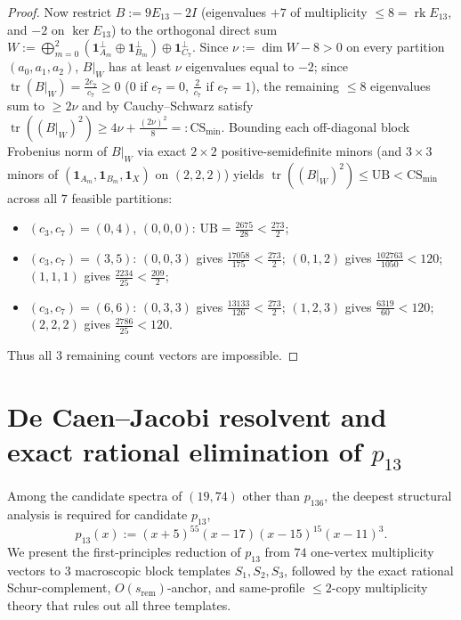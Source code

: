 \documentclass[11pt,reqno]{amsart}
\theoremstyle{definition}
\theoremstyle{remark}
\numberwithin{equation}{section}
\numberwithin{table}{section}
\DeclareMathOperator{\tr}{tr}
\DeclareMathOperator{\rk}{rk}
\begin{document}
\begin{proof}
Now restrict $B := 9 E_{13} - 2I$ (eigenvalues $+7$ of multiplicity $\le 8 = \rk E_{13}$, and $-2$ on $\ker E_{13}$) to the orthogonal direct sum $W := \bigoplus_{m=0}^2 (\mathbf{1}_{A_m}^\perp \oplus \mathbf{1}_{B_m}^\perp) \oplus \mathbf{1}_{C_7}^\perp$. Since $\nu := \dim W - 8 > 0$ on every partition $(a_0, a_1, a_2)$, $B|_W$ has at least $\nu$ eigenvalues equal to $-2$; since $\tr(B|_W) = \frac{2e_7}{c_7} \ge 0$ ($0$ if $e_7 = 0$, $\frac{2}{c_7}$ if $e_7 = 1$), the remaining $\le 8$ eigenvalues sum to $\ge 2\nu$ and by Cauchy--Schwarz satisfy $\tr((B|_W)^2) \ge 4\nu + \frac{(2\nu)^2}{8} =: \mathrm{CS}_{\min}$. Bounding each off-diagonal block Frobenius norm of $B|_W$ via exact $2 \times 2$ positive-semidefinite minors (and $3 \times 3$ minors of $(\mathbf{1}_{A_m}, \mathbf{1}_{B_m}, \mathbf{1}_X)$ on $(2, 2, 2)$) yields $\tr((B|_W)^2) \le \mathrm{UB} < \mathrm{CS}_{\min}$ across all $7$ feasible partitions:
\begin{itemize}
  \item $(c_3, c_7) = (0, 4)$, $(0, 0, 0)$: $\mathrm{UB} = \frac{2675}{28} < \frac{273}{2}$;
  \item $(c_3, c_7) = (3, 5)$: $(0, 0, 3)$ gives $\frac{17058}{175} < \frac{273}{2}$; $(0, 1, 2)$ gives $\frac{102763}{1050} < 120$; $(1, 1, 1)$ gives $\frac{2234}{25} < \frac{209}{2}$;
  \item $(c_3, c_7) = (6, 6)$: $(0, 3, 3)$ gives $\frac{13133}{126} < \frac{273}{2}$; $(1, 2, 3)$ gives $\frac{6319}{60} < 120$; $(2, 2, 2)$ gives $\frac{2786}{25} < 120$.
\end{itemize}
Thus all $3$ remaining count vectors are impossible.
\end{proof}

\section{De Caen--Jacobi resolvent and exact rational elimination of \texorpdfstring{$p_{13}$}{p\_13}}\label{sec:idx13}

Among the candidate spectra of $(19, 74)$ other than $p_{136}$, the deepest structural analysis is required for candidate $p_{13}$,
\begin{equation}\label{eq:chi13}
  p_{13}(x) := (x + 5)^{55}(x - 17)(x - 15)^{15}(x - 11)^3.
\end{equation}
We present the first-principles reduction of $p_{13}$ from $74$ one-vertex multiplicity vectors to $3$ macroscopic block templates $S_1, S_2, S_3$, followed by the exact rational Schur-complement, $O(s_{\mathrm{rem}})$-anchor, and same-profile $\le 2$-copy multiplicity theory that rules out all three templates.
\end{document}

